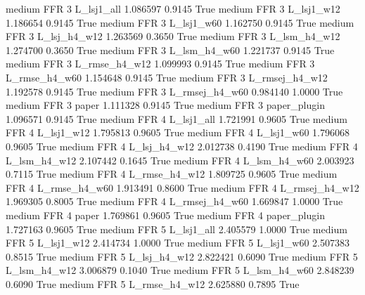     medium      FFR                 3     L_lsj1_all   1.086597      0.9145    True
    medium      FFR                 3     L_lsj1_w12   1.186654      0.9145    True
    medium      FFR                 3     L_lsj1_w60   1.162750      0.9145    True
    medium      FFR                 3   L_lsj_h4_w12   1.263569      0.3650    True
    medium      FFR                 3   L_lsm_h4_w12   1.274700      0.3650    True
    medium      FFR                 3   L_lsm_h4_w60   1.221737      0.9145    True
    medium      FFR                 3  L_rmse_h4_w12   1.099993      0.9145    True
    medium      FFR                 3  L_rmse_h4_w60   1.154648      0.9145    True
    medium      FFR                 3 L_rmsej_h4_w12   1.192578      0.9145    True
    medium      FFR                 3 L_rmsej_h4_w60   0.984140      1.0000    True
    medium      FFR                 3          paper   1.111328      0.9145    True
    medium      FFR                 3   paper_plugin   1.096571      0.9145    True
    medium      FFR                 4     L_lsj1_all   1.721991      0.9605    True
    medium      FFR                 4     L_lsj1_w12   1.795813      0.9605    True
    medium      FFR                 4     L_lsj1_w60   1.796068      0.9605    True
    medium      FFR                 4   L_lsj_h4_w12   2.012738      0.4190    True
    medium      FFR                 4   L_lsm_h4_w12   2.107442      0.1645    True
    medium      FFR                 4   L_lsm_h4_w60   2.003923      0.7115    True
    medium      FFR                 4  L_rmse_h4_w12   1.809725      0.9605    True
    medium      FFR                 4  L_rmse_h4_w60   1.913491      0.8600    True
    medium      FFR                 4 L_rmsej_h4_w12   1.969305      0.8005    True
    medium      FFR                 4 L_rmsej_h4_w60   1.669847      1.0000    True
    medium      FFR                 4          paper   1.769861      0.9605    True
    medium      FFR                 4   paper_plugin   1.727163      0.9605    True
    medium      FFR                 5     L_lsj1_all   2.405579      1.0000    True
    medium      FFR                 5     L_lsj1_w12   2.414734      1.0000    True
    medium      FFR                 5     L_lsj1_w60   2.507383      0.8515    True
    medium      FFR                 5   L_lsj_h4_w12   2.822421      0.6090    True
    medium      FFR                 5   L_lsm_h4_w12   3.006879      0.1040    True
    medium      FFR                 5   L_lsm_h4_w60   2.848239      0.6090    True
    medium      FFR                 5  L_rmse_h4_w12   2.625880      0.7895    True

